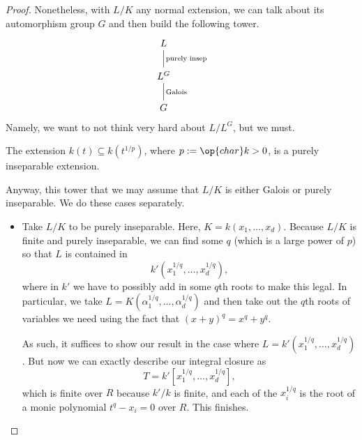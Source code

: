 \documentclass[../notes.tex]{subfiles}
\begin{document}
\begin{proof}
	Nonetheless, with $L/K$ any normal extension, we can talk about its automorphism group $G$ and then build the following tower.
	\[\begin{tikzcd}
		L \\
		{L^G} \\
		G
		\arrow["{\text{Galois}}"', no head, from=3-1, to=2-1]
		\arrow["{\text{purely insep}}"', no head, from=2-1, to=1-1]
	\end{tikzcd}\]
	Namely, we want to not think very hard about $L/L^G$, but we must.
	\begin{example}
		The extension $k(t)\subseteq k\left(t^{1/p}\right)$, where $p:=\op{char}k>0$, is a purely inseparable extension.
	\end{example}
	Anyway, this tower that we may assume that $L/K$ is either Galois or purely inseparable. We do these cases separately.
	\begin{itemize}
		\item Take $L/K$ to be purely inseparable. Here, $K=k(x_1,\ldots,x_d)$. Because $L/K$ is finite and purely inseparable, we can find some $q$ (which is a large power of $p$) so that $L$ is contained in
		\[k'\left(x_1^{1/q},\ldots,x_d^{1/q}\right),\]
		where in $k'$ we have to possibly add in some $q$th roots to make this legal. In particular, we take $L=K\left(\alpha_1^{1/q},\ldots,\alpha_d^{1/q}\right)$ and then take out the $q$th roots of variables we need using the fact that $(x+y)^q=x^q+y^q$.

		As such, it suffices to show our result in the case where $L=k'\left(x_1^{1/q},\ldots,x_d^{1/q}\right)$. But now we can exactly describe our integral closure as
		\[T=k'\left[x_1^{1/q},\ldots,x_d^{1/q}\right],\]
		which is finite over $R$ because $k'/k$ is finite, and each of the $x_i^{1/q}$ is the root of a monic polynomial $t^q-x_i=0$ over $R$. This finishes.


\end{itemize}
\end{proof}
\end{document}
